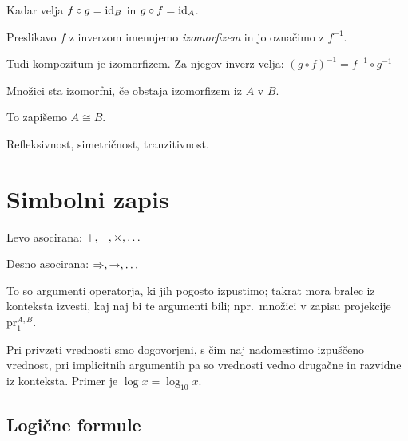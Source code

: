 
Kadar velja $f \circ g = \mathrm{id}_B$ in $g \circ f = \mathrm{id}_A$.

Preslikavo $f$ z inverzom imenujemo \textit{izomorfizem} in jo označimo z $f^{-1}$.


Tudi kompozitum je izomorfizem. Za njegov inverz velja:
$(g \circ f)^{-1} = f^{-1} \circ g^{-1}$


Množici sta izomorfni, če obstaja izomorfizem iz $A$ v $B$.

To zapišemo $A \cong B$.


Refleksivnost, simetričnost, tranzitivnost.

\section{Simbolni zapis}


Levo asocirana: $+, -, \times, \ldots$

Desno asocirana: $\Rightarrow, \to, \ldots$


To so argumenti operatorja, ki jih pogosto izpustimo; takrat mora bralec iz konteksta izvesti, kaj naj bi te argumenti bili; npr.\ množici v zapisu projekcije $\text{pr}_1^{A,B}$.


Pri privzeti vrednosti smo dogovorjeni, s čim naj nadomestimo izpuščeno vrednost, pri implicitnih argumentih pa so vrednosti vedno drugačne in razvidne iz konteksta. Primer je $\log x = \log_{10} x$.

\subsection{Logične formule}



